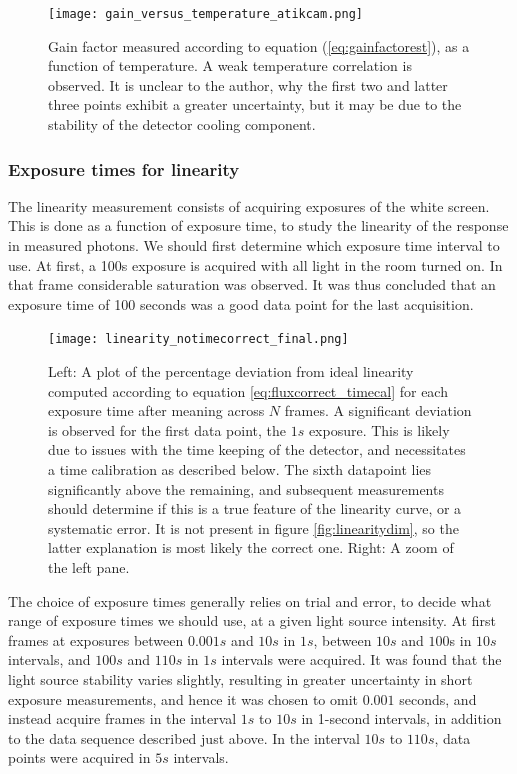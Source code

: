 \documentclass[../main.tex]{subfiles}
\begin{document}
		\begin{figure}[h!]
			\centering
			\texttt{[image: gain\_versus\_temperature\_atikcam.png]}
			\caption{Gain factor measured according to equation (\ref{eq:gainfactorest}), as a function of temperature. A weak temperature correlation is observed. It is unclear to the author, why the first two and latter three points exhibit a greater uncertainty, but it may be due to the stability of the detector cooling component.}
			\label{fig:gainvtemp}
		\end{figure}
		
		\subsubsection{Exposure times for linearity}\label{sec:explin}
		The linearity measurement consists of acquiring exposures of the white screen. This is done as a function of exposure time, to study the linearity of the response in measured photons. We should first determine which exposure time interval to use. At first, a 100s exposure is acquired with all light in the room turned on. In that frame considerable saturation was observed. It was thus concluded that an exposure time of 100 seconds was a good data point for the last acquisition. 
		\begin{figure}[h!]
			\centering			\texttt{[image: linearity\_notimecorrect\_final.png]}
			\caption{Left: A plot of the percentage deviation from ideal linearity computed according to equation  \ref{eq:fluxcorrect_timecal} for each exposure time after meaning across $N$ frames. A significant deviation is observed for the first data point, the $1s$ exposure. This is likely due to issues with the time keeping of the detector, and necessitates a time calibration as described below. The sixth datapoint lies significantly above the remaining, and subsequent measurements should determine if this is a true feature of the linearity curve, or a systematic error. It is not present in figure \ref{fig:linearitydim}, so the latter explanation is most likely the correct one. Right: A zoom of the left pane.}
			\label{fig:linearity}
		\end{figure}
		
		The choice of exposure times generally relies on trial and error, to decide what range of exposure times we should use, at a given light source intensity. At first frames at exposures between $0.001s$ and $10s$ in $1s$, between $10s$ and $100$s in $10s$ intervals, and $100s$ and $110s$ in $1s$ intervals were acquired. It was found that the light source stability varies slightly, resulting in greater uncertainty in short exposure measurements, and hence it was chosen to omit $0.001$ seconds, and instead acquire frames in the interval $1s$ to $10s$ in 1-second intervals, in addition to the data sequence described just above. In the interval $10s$ to $110s$, data points were acquired in $5s$ intervals.  
		
\end{document}
